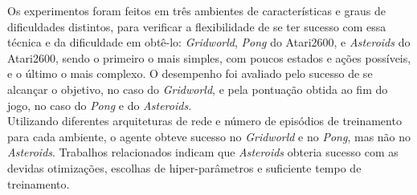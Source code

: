 Os experimentos foram feitos em três ambientes de características e graus de dificuldades distintos, para verificar a flexibilidade de se ter sucesso com essa técnica e da dificuldade em obtê-lo: \textit{Gridworld}, \textit{Pong} do Atari2600, e \textit{Asteroids} do Atari2600, sendo o primeiro o mais simples, com poucos estados e ações possíveis, e o último o mais complexo.
O desempenho foi avaliado pelo sucesso de se alcançar o objetivo, no caso do \textit{Gridworld}, e pela pontuação obtida ao fim do jogo, no caso do \textit{Pong} e do \textit{Asteroids}.
\\

Utilizando diferentes arquiteturas de rede e número de episódios de treinamento para cada ambiente, o agente obteve sucesso no \textit{Gridworld} e no \textit{Pong}, mas não no \textit{Asteroids}.
Trabalhos relacionados indicam que \textit{Asteroids} obteria sucesso com as devidas otimizações, escolhas de hiper-parâmetros e suficiente tempo de treinamento.
\\






